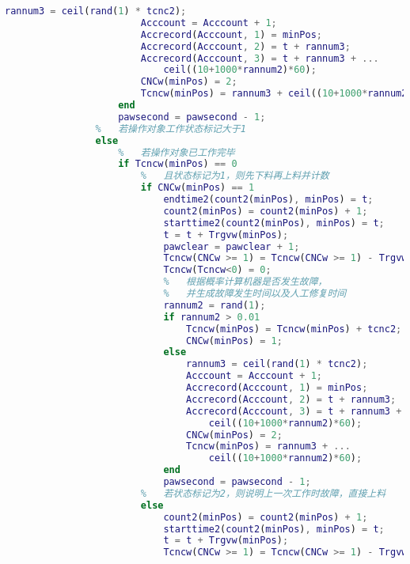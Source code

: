 \documentclass[no-math,withoutpreface,bwprint]{cumcmthesis} %
\numberwithin{equation}{section}
\numberwithin{figure}{section}
\numberwithin{table}{section}
\begin{document}
\begin{lstlisting}[language=matlab]
                        rannum3 = ceil(rand(1) * tcnc2);
                        Acccount = Acccount + 1;
                        Accrecord(Acccount, 1) = minPos;
                        Accrecord(Acccount, 2) = t + rannum3;
                        Accrecord(Acccount, 3) = t + rannum3 + ...
                            ceil((10+1000*rannum2)*60);
                        CNCw(minPos) = 2;
                        Tcncw(minPos) = rannum3 + ceil((10+1000*rannum2)*60);
                    end
                    pawsecond = pawsecond - 1;
                %   若操作对象工作状态标记大于1
                else
                    %   若操作对象已工作完毕
                    if Tcncw(minPos) == 0
                        %   且状态标记为1，则先下料再上料并计数
                        if CNCw(minPos) == 1
                            endtime2(count2(minPos), minPos) = t;
                            count2(minPos) = count2(minPos) + 1;
                            starttime2(count2(minPos), minPos) = t;
                            t = t + Trgvw(minPos);
                            pawclear = pawclear + 1;
                            Tcncw(CNCw >= 1) = Tcncw(CNCw >= 1) - Trgvw(minPos);
                            Tcncw(Tcncw<0) = 0;
                            %   根据概率计算机器是否发生故障，
                            %   并生成故障发生时间以及人工修复时间
                            rannum2 = rand(1);
                            if rannum2 > 0.01
                                Tcncw(minPos) = Tcncw(minPos) + tcnc2;
                                CNCw(minPos) = 1;
                            else
                                rannum3 = ceil(rand(1) * tcnc2);
                                Acccount = Acccount + 1;
                                Accrecord(Acccount, 1) = minPos;
                                Accrecord(Acccount, 2) = t + rannum3;
                                Accrecord(Acccount, 3) = t + rannum3 + ...
                                    ceil((10+1000*rannum2)*60);
                                CNCw(minPos) = 2;
                                Tcncw(minPos) = rannum3 + ...
                                    ceil((10+1000*rannum2)*60);
                            end
                            pawsecond = pawsecond - 1;
                        %   若状态标记为2，则说明上一次工作时故障，直接上料
                        else
                            count2(minPos) = count2(minPos) + 1;
                            starttime2(count2(minPos), minPos) = t;
                            t = t + Trgvw(minPos);
                            Tcncw(CNCw >= 1) = Tcncw(CNCw >= 1) - Trgvw(minPos);

\end{lstlisting}
\end{document}
